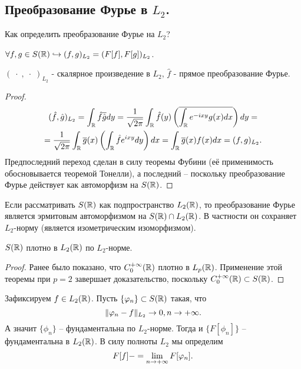 \subsection{Преобразование Фурье в $L_2$.}
\begin{note}
    Как определить преобразование Фурье на $L_2$?
\end{note}
\begin{lemma}
    $\forall f, g \in S(\mathbb{R}) \hookrightarrow (f, g)_{L_2} = (F[f], F[g])_{L_2}$.
\end{lemma}
\begin{note}
    $(\;\cdot\;,\;\cdot\;)_{L_2}$ - скалярное произведение в $L_2$, $\hat{f}$ - прямое преобразование Фурье.
\end{note}
\begin{proof}
    \begin{multline*}
    (\hat{f}, \hat{g})_{L_2} = \int_{\mathbb{R}} \hat{f} \overline{\hat{g}}dy = \dfrac{1}{\sqrt {2\pi}} \int_{\mathbb{R}} \hat{f}(y) \left( \overline{\int_{\mathbb{R}} e^{-ixy}g(x)dx} \right)dy = \\ = \dfrac{1}{\sqrt {2\pi}} \int_{\mathbb{R}} \overline{g}(x) \left( \int_{\mathbb{R}} \hat{f}e^{ixy}dy \right) dx = \int_{\mathbb{R}} \overline{g}(x)f(x) dx = (f, g)_{L_2}.
    \end{multline*}
    Предпоследний переход сделан в силу теоремы Фубини (её применимость обосновывается теоремой Тонелли), а последний -- поскольку преобразование Фурье действует как автоморфизм на $S(\mathbb{R})$.
\end{proof}
\begin{corollary}
    Если рассматривать $S(\mathbb{R})$ как подпространство $L_2(\mathbb{R})$, то преобразование Фурье является эрмитовым автоморфизмом на $S(\mathbb{R}) \cap L_2(\mathbb{R})$.
    В частности он сохраняет $L_2$-норму (является изометрическим изоморфизмом).
\end{corollary}
\begin{lemma}
    $S(\mathbb{R})$ плотно в $L_2(\mathbb{R})$ по $L_2$-норме.
\end{lemma}
\begin{proof}
    Ранее было показано, что $C_0^{+\infty}(\mathbb{R})$ плотно в $L_p(\mathbb{R})$.
    Применение этой теоремы при $p = 2$ завершает доказательство, поскольку $C_0^{+\infty}(\mathbb{R}) \subset S(\mathbb{R})$.
\end{proof}
\begin{definition}
    Зафиксируем $f \in L_2(\mathbb{R})$.
    Пусть $\{\varphi_n\} \subset S(\mathbb{R})$ такая, что
    \[
        \|\varphi_n - f\|_{L_2} \rightarrow 0, n \rightarrow +\infty.
    \]
    А значит $\{\phi_n\}$ -- фундаментальна по $L_2$-норме.
    Тогда и $\{F[\phi_n]\}$ -- фундаментальна в $L_2(\mathbb{R})$.
    В силу полноты $L_2$ мы определим
    \[
        F[f] -= \lim\limits_{n \rightarrow +\infty} F[\varphi_n].
    \]
\end{definition}

